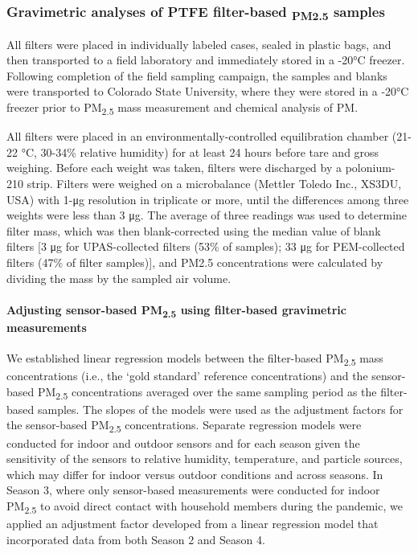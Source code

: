 \documentclass[
  letterpaper,
  DIV=11,
  numbers=noendperiod]{scrartcl}
\let\oldparagraph\paragraph
\renewcommand{\paragraph}[1]{\oldparagraph{#1}\mbox{}}
\begin{document}
\hypertarget{gravimetric-analyses-of-ptfe-filter-based-pm2.5-samples}{%
\subsubsection{\texorpdfstring{Gravimetric analyses of PTFE filter-based
\textsubscript{PM2.5}
samples}{Gravimetric analyses of PTFE filter-based PM2.5 samples}}\label{gravimetric-analyses-of-ptfe-filter-based-pm2.5-samples}}

All filters were placed in individually labeled cases, sealed in plastic
bags, and then transported to a field laboratory and immediately stored
in a -20°C freezer. Following completion of the field sampling campaign,
the samples and blanks were transported to Colorado State University,
where they were stored in a -20°C freezer prior to PM\textsubscript{2.5}
mass measurement and chemical analysis of PM.

All filters were placed in an environmentally-controlled equilibration
chamber (21-22 °C, 30-34\% relative humidity) for at least 24 hours
before tare and gross weighing. Before each weight was taken, filters
were discharged by a polonium-210 strip. Filters were weighed on a
microbalance (Mettler Toledo Inc., XS3DU, USA) with 1-μg resolution in
triplicate or more, until the differences among three weights were less
than 3 μg. The average of three readings was used to determine filter
mass, which was then blank-corrected using the median value of blank
filters {[}3 μg for UPAS-collected filters (53\% of samples); 33 μg for
PEM-collected filters (47\% of filter samples){]}, and PM2.5
concentrations were calculated by dividing the mass by the sampled air
volume.

\hypertarget{adjusting-sensor-based-pm2.5-using-filter-based-gravimetric-measurements}{%
\paragraph{\texorpdfstring{Adjusting sensor-based PM\textsubscript{2.5}
using filter-based gravimetric
measurements}{Adjusting sensor-based PM2.5 using filter-based gravimetric measurements}}\label{adjusting-sensor-based-pm2.5-using-filter-based-gravimetric-measurements}}

We established linear regression models between the filter-based
PM\textsubscript{2.5} mass concentrations (i.e., the `gold standard'
reference concentrations) and the sensor-based PM\textsubscript{2.5}
concentrations averaged over the same sampling period as the
filter-based samples. The slopes of the models were used as the
adjustment factors for the sensor-based PM\textsubscript{2.5}
concentrations. Separate regression models were conducted for indoor and
outdoor sensors and for each season given the sensitivity of the sensors
to relative humidity, temperature, and particle sources, which may
differ for indoor versus outdoor conditions and across seasons. In
Season 3, where only sensor-based measurements were conducted for indoor
PM\textsubscript{2.5} to avoid direct contact with household members
during the pandemic, we applied an adjustment factor developed from a
linear regression model that incorporated data from both Season 2 and
Season 4.
\end{document}
